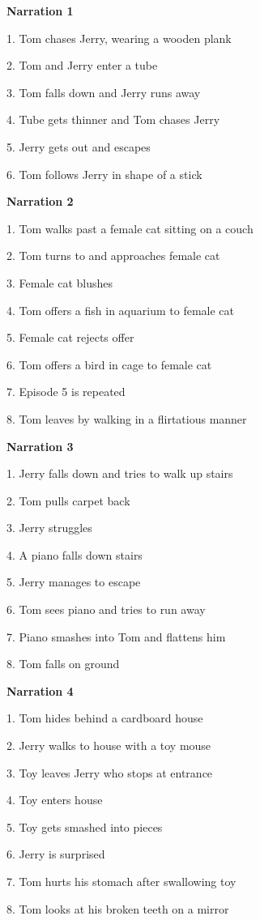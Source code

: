 \documentclass[review]{elsarticle} %
\begin{document}
\label{section:b}

\textbf{Narration 1}

1. Tom chases Jerry, wearing a wooden plank

2. Tom and Jerry enter a tube

3. Tom falls down and Jerry runs away

4. Tube gets thinner and Tom chases Jerry

5. Jerry gets out and escapes

6. Tom follows Jerry in shape of a stick

\textbf{Narration 2}

1. Tom walks past a female cat sitting on a couch

2. Tom turns to and approaches female cat

3. Female cat blushes

4. Tom offers a fish in aquarium to female cat

5. Female cat rejects offer

6. Tom offers a bird in cage to female cat

7. Episode 5 is repeated

8. Tom leaves by walking in a flirtatious manner

\textbf{Narration 3}

1. Jerry falls down and tries to walk up stairs

2. Tom pulls carpet back

3. Jerry struggles

4. A piano falls down stairs

5. Jerry manages to escape

6. Tom sees piano and tries to run away

7. Piano smashes into Tom and flattens him

8. Tom falls on ground

\textbf{Narration 4}

1. Tom hides behind a cardboard house

2. Jerry walks to house with a toy mouse

3. Toy leaves Jerry who stops at entrance

4. Toy enters house

5. Toy gets smashed into pieces

6. Jerry is surprised

7. Tom hurts his stomach after swallowing toy

8. Tom looks at his broken teeth on a mirror
\end{document}
